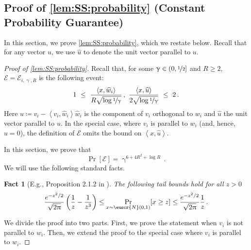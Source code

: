 \documentclass[11pt,letterpaper]{article}
\theoremstyle{plain}
\newtheorem{fact}[theorem]{Fact}
\theoremstyle{definition}
\theoremstyle{remark}
\newcommand{\inparen}[1]{\ensuremath{\left(#1\right)}}
\newcommand{\inangle}[1]{\left\langle#1\right\rangle}
\newcommand{\evE}{\ensuremath{\mathscr{E}}}
\newcommand{\nfrac}[2]{\nicefrac{#1}{#2}}
\renewcommand{\hat}{\widehat}
\newcommand{\wh}[1]{\widehat{#1}}
\newcommand{\customcal}[1]{\euscr{#1}}
\newcommand{\cN}{\customcal{N}}
\renewcommand{\gamma}{\upgamma}
\renewcommand{\pi}{\uppi}
\begin{document}
{{{        \subsection{Proof of \cref{lem:SS:probability} (Constant Probability Guarantee)}
            \label{sec:proofof:lem:SS:probability}
            In this section, we prove \cref{lem:SS:probability}, which we restate below.
            Recall that for any vector $u$, we use $\wh{u}$ to denote the unit vector parallel to $u$.
            \lemSSprobability*
            \begin{proof}[Proof of \cref{lem:SS:probability}]
                Recall that, for some $\gamma\in (0,\nfrac{1}{2}]$ and $R\geq 2$, $\evE=\evE_{i,\gamma,R}$ is the following event:
                \[
                    1 ~\leq~ 
                    \frac{\inangle{x, \wh{w}_i}}{
                        R\sqrt{\log{\nfrac{1}{\gamma}}}
                    }\,,
                    ~
                    \frac{\inangle{x, \wh{u}}}{
                        2\sqrt{\log{\nfrac{1}{\gamma}}}
                    }
                    ~\leq~ 2\,.
                \]
                Here $u\coloneqq v_i - \inangle{v_i,\wh{w}_i}\wh{w}_i$ is the component of $v_i$ orthogonal to $w_i$ {and $\hat u$ the unit vector parallel to $u$}.
                In the special case, where $v_i$ is parallel to $w_i$ (and, hence, $u=0$), the definition of $\evE$ omits the bound on $\inangle{x, \wh{u}}.$
                
                In this section, we prove that 
                \[
                    \Pr[\evE] = \gamma^{6+4R^2+\log{R}}\,.
                \]
                We will use the following standard facts.
                \begin{fact}[E.g., Proposition 2.1.2 in \citet{vershynin2018high}]\label{fact:GaussianTail}
                    The following tail bounds hold for all $z>0$
                    \[
                        \frac{e^{-z^2/2}}{\sqrt{2\pi}}\inparen{\frac{1}{z} - \frac{1}{z^3}}
                        \leq 
                        \Pr_{x\sim \cN(0,1)}[x\geq z]
                        \leq \frac{e^{-z^2/2}}{\sqrt{2\pi}}\frac{1}{z}\,.
                    \]
                \end{fact}
                We divide the proof into two parts.
                First, we prove the statement when $v_i$ is not parallel to $w_i$.
                Then, we extend the proof to the special case where $v_i$ is parallel to $w_i$.


\end{proof}}}}
\end{document}
